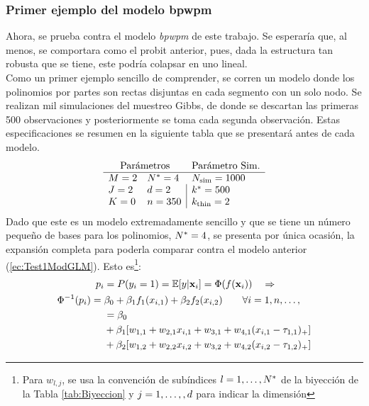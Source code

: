 \documentclass[../Main/Main.tex]{subfiles}
\begin{document}
\subsubsection*{Primer ejemplo del modelo bpwpm}
Ahora, se prueba contra el modelo \textit{bpwpm} de este trabajo. Se esperaría que, al menos, se comportara como el probit anterior, pues, dada la estructura tan robusta que se tiene, este podría colapsar en uno lineal. \\

Como un primer ejemplo sencillo de comprender, se corren un modelo donde los polinomios por partes son rectas disjuntas en cada segmento con un solo nodo. Se realizan mil simulaciones del muestreo Gibbs, de donde se descartan las primeras 500 observaciones y posteriormente se toma cada segunda observación. Estas especificaciones se resumen en la siguiente tabla que se presentará antes de cada modelo. \\
$$\paramsmod{2}{2}{0}{4}{2}{350}{1000}{500}{2}$$
Dado que este es un modelo extremadamente sencillo y que se tiene un número pequeño de bases para los polinomios, $N^* = 4$, se presenta por única ocasión, la expansión completa para poderla comparar contra el modelo anterior (\ref{ec:Test1ModGLM}). Esto es\footnote{Para $w_{l,j}$, se usa la convención de subíndices $l = 1,\ldots,N^*$ de la biyección de la Tabla \ref{tab:Biyeccion} y $j = 1,\ldots,,{d}$ para indicar la dimensión}: 
\begin{align}
	p_i &= P(y_i = 1) =\mathbb{E}[y|\mathbf{x}_i] = \Phi(f(\mathbf{x}_i))  \quad \Rightarrow  			\nonumber \\
	\Phi^{-1}(p_i) = \;&\beta_0 + \beta_1f_1(x_{i,1}) + \beta_2f_2(x_{i,2}) 
	\qquad 	\forall i = 1,n,\ldots,\label{ec:Test1Ej1} \\
	&= \beta_0 \nonumber \\
	&+ \beta_1[w_{1,1} + w_{2,1}x_{i,1} + w_{3,1} + w_{4,1}(x_{i,1} - \tau_{1,1})_+] \label{ec:Test1Ej1F1}\\
	& +\beta_2[w_{1,2} + w_{2,2}x_{i,2} + w_{3,2} + w_{4,2}(x_{i,2} - \tau_{1,2})_+] \label{ec:Test1Ej1F2}
\end{align}
\end{document}
